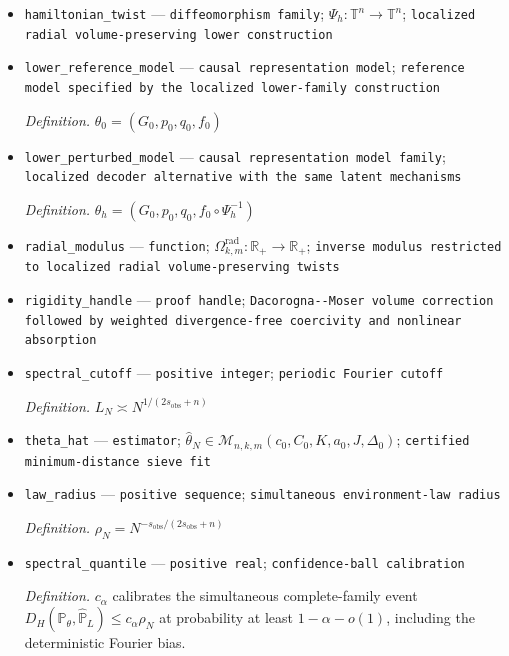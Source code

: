 \documentclass{article}
\begin{document}
\begin{itemize}
  \item \texttt{hamiltonian\_\allowbreak{}twist} --- \texttt{diffeomorphism family}; \(\Psi_h:\mathbb T^n\to\mathbb T^n\); \texttt{localized radial volume-\allowbreak{}preserving lower construction}
  \item \texttt{lower\_\allowbreak{}reference\_\allowbreak{}model} --- \texttt{causal representation model}; \texttt{reference model specified by the localized lower-\allowbreak{}family construction}
  \par\smallskip\noindent\emph{Definition.} \(\theta_0=(G_0,p_0,q_0,f_0)\)
  \item \texttt{lower\_\allowbreak{}perturbed\_\allowbreak{}model} --- \texttt{causal representation model family}; \texttt{localized decoder alternative with the same latent mechanisms}
  \par\smallskip\noindent\emph{Definition.} \(\theta_h=(G_0,p_0,q_0,f_0\circ\Psi_h^{-1})\)
  \item \texttt{radial\_\allowbreak{}modulus} --- \texttt{function}; \(\Omega_{k,m}^{\mathrm{rad}}:\mathbb R_+\to\mathbb R_+\); \texttt{inverse modulus restricted to localized radial volume-\allowbreak{}preserving twists}
  \item \texttt{rigidity\_\allowbreak{}handle} --- \texttt{proof handle}; \texttt{Dacorogna-\allowbreak{}-\allowbreak{}Moser volume correction followed by weighted divergence-\allowbreak{}free coercivity and nonlinear absorption}
  \item \texttt{spectral\_\allowbreak{}cutoff} --- \texttt{positive integer}; \texttt{periodic Fourier cutoff}
  \par\smallskip\noindent\emph{Definition.} \(L_N\asymp N^{1/(2s_{\mathrm{obs}}+n)}\)
  \item \texttt{theta\_\allowbreak{}hat} --- \texttt{estimator}; \(\widehat\theta_N\in\mathcal M_{n,k,m}(c_0,C_0,K,a_0,J,\Delta_0)\); \texttt{certified minimum-\allowbreak{}distance sieve fit}
  \item \texttt{law\_\allowbreak{}radius} --- \texttt{positive sequence}; \texttt{simultaneous environment-\allowbreak{}law radius}
  \par\smallskip\noindent\emph{Definition.} \(\rho_N=N^{-s_{\mathrm{obs}}/(2s_{\mathrm{obs}}+n)}\)
  \item \texttt{spectral\_\allowbreak{}quantile} --- \texttt{positive real}; \texttt{confidence-\allowbreak{}ball calibration}
  \par\smallskip\noindent\emph{Definition.} \(c_\alpha\) calibrates the simultaneous complete-family event \(D_H(\mathbb P_\theta,\widehat{\mathbb P}_L)\le c_\alpha\rho_N\) at probability at least \(1-\alpha-o(1)\), including the deterministic Fourier bias.

\end{itemize}
\end{document}
